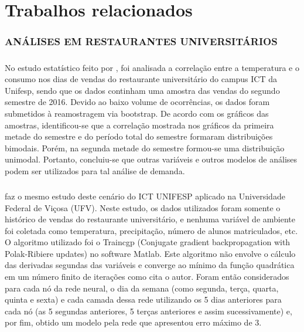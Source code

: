 \documentclass[	12pt, Times, openright, twoside, a4paper, english, brazil]{abntex2}
\begin{document}
  \chapter{Trabalhos relacionados}
    \subsection{ANÁLISES EM RESTAURANTES UNIVERSITÁRIOS}
        \paragraph*{} No estudo estatístico feito por \cite{Landim2016}, foi analisada a correlação entre a temperatura e o consumo nos dias de vendas do restaurante universitário do campus ICT da Unifesp, sendo que os dados continham uma amostra das vendas do segundo semestre de 2016. Devido ao baixo volume de ocorrências, os dados foram submetidos à reamostragem via bootstrap. De acordo com os gráficos das amostras, identificou-se que a correlação mostrada nos gráficos da primeira metade do semestre e do período total do semestre formaram distribuições bimodais. Porém, na segunda metade do semestre formou-se uma distribuição unimodal. Portanto, concluiu-se que outras variáveis e outros modelos de análises podem ser utilizados para tal análise de demanda.
        
        \paragraph*{} \cite{Lopes2008} faz o mesmo estudo deste cenário do ICT UNIFESP aplicado na Universidade Federal de Viçosa (UFV). Neste estudo, os dados utilizados foram somente o histórico de vendas do restaurante universitário, e nenhuma variável de ambiente foi coletada como temperatura, precipitação, número de alunos matriculados, etc. O algoritmo utilizado foi o Traincgp (Conjugate gradient backpropagation with Polak-Ribiere updates) no software Matlab. Este algoritmo não envolve o cálculo das derivadas segundas das variáveis e converge ao mínimo da função quadrática em um número finito de iterações como cita o autor. Foram então considerados para cada nó da rede neural, o dia da semana (como segunda, terça, quarta, quinta e sexta) e cada camada dessa rede utilizando os 5 dias anteriores para cada nó (as 5 segundas anteriores, 5 terças anteriores e assim sucessivamente) e, por fim, obtido um modelo pela rede que apresentou erro máximo de 3.
        
\end{document}
